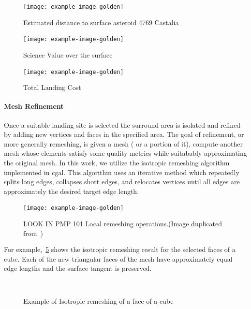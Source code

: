 \begin{figure}[htbp]
    \centering
    \texttt{[image: example-image-golden]}
    \caption[Distance to Surface]{Estimated distance to surface asteroid 4769 Castalia~\label{fig:surface_distance_castalia}}
\end{figure}

\begin{figure}[htbp]
    \centering
    \texttt{[image: example-image-golden]}
    \caption[Science Value]{Science Value over the surface~\label{fig:surface_science_castalia}}
\end{figure}

\begin{figure}[htbp]
    \centering
    \texttt{[image: example-image-golden]}
    \caption[Total Surface Landing Cost]{Total Landing Cost~\label{fig:surface_total_castalia}}
\end{figure}

\paragraph{Mesh Refinement}\label{sec:refinement}
Once a suitable landing site is selected the surround area is isolated and refined by adding new vertices and faces in the specified area.
The goal of refinement, or more generally remeshing, is given a mesh ( or a portion of it), compute another mesh whose elements satisfy some quality metrics while suitabably approximating the original mesh.
In this work, we utilize the isotropic remeshing algorithm implemented in \gls{cgal}.
This algorithm uses an iterative method which repeatedly splits long edges, collapses short edges, and relocates vertices until all edges are approximately the desired target edge length.
\begin{figure}[htbp]
    \centering
    \texttt{[image: example-image-golden]}
    \caption[Isotropic Remeshing]{LOOK IN PMP 101 Local remeshing operations.(Image duplicated from~\cite{botsch2010})\label{fig:isotropic_remeshing}}
\end{figure}
For example,~\cref{fig:cube_remesh} shows the isotropic remeshing result for the selected faces of a cube.
Each of the new triangular faces of the mesh have approximately equal edge lengths and the surface tangent is preserved.
\begin{figure}[htbp]
    \centering
    ~
    \caption{Example of Isotropic remeshing of a face of a cube\label{fig:cube_remesh}}
\end{figure}

